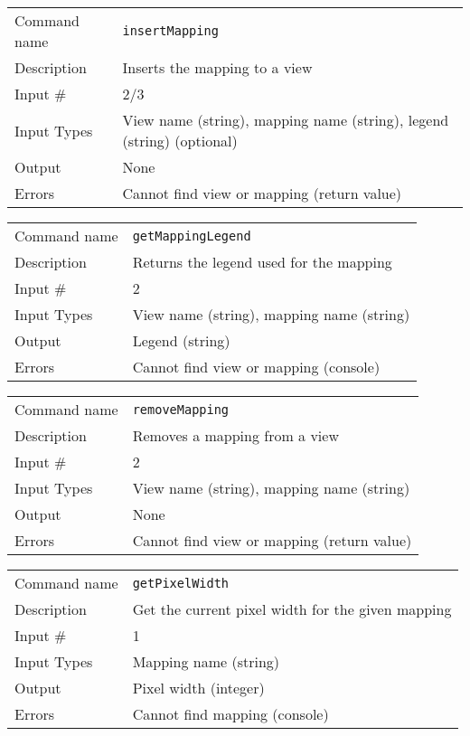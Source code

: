 \bigskip

\noindent
\begin{tabular}{l|p{5in}}
\hline
Command name & {\tt insertMapping} \\
Description  & Inserts the mapping to a view \\
Input \#     & 2/3 \\
Input Types  & View name (string), mapping name (string), legend (string)
               (optional) \\
Output       & None \\
Errors       & Cannot find view or mapping (return value) \\
\hline
\end{tabular}

\bigskip

\noindent
\begin{tabular}{l|p{5in}}
\hline
Command name & {\tt getMappingLegend} \\
Description  & Returns the legend used for the mapping \\
Input \#     & 2 \\
Input Types  & View name (string), mapping name (string) \\
Output       & Legend (string) \\
Errors       & Cannot find view or mapping (console) \\
\hline
\end{tabular}

\bigskip

\noindent
\begin{tabular}{l|p{5in}}
\hline
Command name & {\tt removeMapping} \\
Description  & Removes a mapping from a view \\
Input \#     & 2 \\
Input Types  & View name (string), mapping name (string) \\
Output       & None \\
Errors       & Cannot find view or mapping (return value) \\
\hline
\end{tabular}

\bigskip

\noindent
\begin{tabular}{l|p{5in}}
\hline
Command name & {\tt getPixelWidth} \\
Description  & Get the current pixel width for the given mapping \\
Input \#     & 1 \\
Input Types  & Mapping name (string) \\
Output       & Pixel width (integer) \\
Errors       & Cannot find mapping (console) \\
\hline
\end{tabular}

